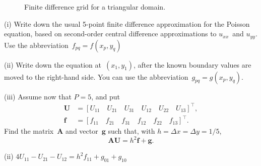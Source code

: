 \begin{Exercises}
\begin{figure}
\caption{Finite difference grid for a triangular domain.}
\label{fig: finite diff triangle}
\begin{center}
\end{center}
\end{figure}
\begin{description}
\item{(i)}
Write down the usual 5-point finite difference approximation for the
Poisson equation, based on second-order central difference
approximations to $u_{xx}$~and $u_{yy}$.  Use the
abbreviation~$f_{pq}=f(x_p,y_q)$
\item{(ii)}
Write down the equation at~$(x_1,y_1)$, after the known boundary
values are moved to the right-hand side.  You can use the
abbreviation~$g_{pq}=g(x_p,y_q)$.
\item{(iii)}
Assume now that $P=5$, and put
\begin{align*}
\boldsymbol{U}&=[U_{11}\quad U_{21}\quad U_{31}\quad U_{12} \quad U_{22}
        \quad U_{13}]^\top,\\
\boldsymbol{f}&=[f_{11}\quad f_{21}\quad f_{31}\quad f_{12} \quad f_{22}
        \quad f_{13}]^\top.
\end{align*}
Find the matrix~$\boldsymbol{A}$ and vector~$\boldsymbol{g}$ such that, with
$h=\Delta x=\Delta y=1/5$,
\[
\boldsymbol{A}\boldsymbol{U}=h^2\boldsymbol{f}+\boldsymbol{g}.
\]
\end{description}
\begin{ans}
(ii) $4U_{11}-U_{21}-U_{12}=h^2f_{11}+g_{01}+g_{10}$ \\

\end{ans}
\end{Exercises}
